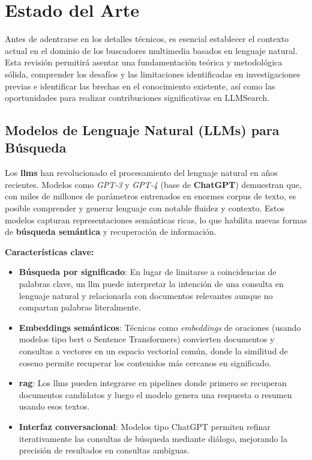 
\chapter{Estado del Arte}
\label{marcoteorico}

Antes de adentrarse en los detalles técnicos, es esencial establecer el contexto actual en el dominio de los buscadores multimedia basados en lenguaje natural. Esta revisión permitirá asentar una fundamentación teórica y metodológica sólida, comprender los desafíos y las limitaciones identificadas en investigaciones previas e identificar las brechas en el conocimiento existente, así como las oportunidades para realizar contribuciones significativas en LLMSearch.

\section{Modelos de Lenguaje Natural (LLMs) para Búsqueda}

Los \textbf{\glspl{llm}} han revolucionado el procesamiento del lenguaje natural en años recientes. Modelos como \emph{GPT-3} y \emph{GPT-4} (base de \textbf{ChatGPT}) demuestran que, con miles de millones de parámetros entrenados en enormes corpus de texto, es posible comprender y generar lenguaje con notable fluidez y contexto. Estos modelos capturan representaciones semánticas ricas, lo que habilita nuevas formas de \textbf{búsqueda semántica} y recuperación de información.

\textbf{Características clave:}

\begin{itemize}
  \item \textbf{Búsqueda por significado}: En lugar de limitarse a coincidencias de palabras clave, un \gls{llm} puede interpretar la intención de una consulta en lenguaje natural y relacionarla con documentos relevantes aunque no compartan palabras literalmente.
  
  \item \textbf{Embeddings semánticos}: Técnicas como \emph{embeddings} de oraciones (usando modelos tipo \gls{bert} o Sentence Transformers) convierten documentos y consultas a vectores en un espacio vectorial común, donde la similitud de coseno permite recuperar los contenidos más cercanos en significado.
  
  \item \textbf{\gls{rag}}: Los \glspl{llm} pueden integrarse en pipelines donde primero se recuperan documentos candidatos y luego el modelo genera una respuesta o resumen usando esos textos.
  
  \item \textbf{Interfaz conversacional}: Modelos tipo ChatGPT permiten refinar iterativamente las consultas de búsqueda mediante diálogo, mejorando la precisión de resultados en consultas ambiguas.
\end{itemize}

